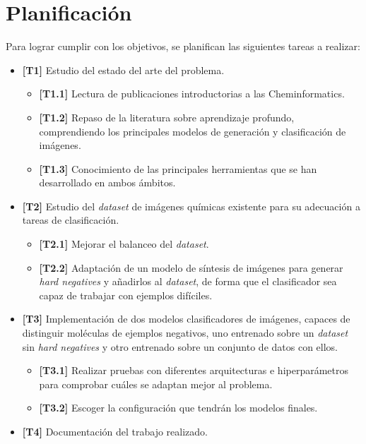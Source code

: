 \section{Planificación} \label{planificacion}
Para lograr cumplir con los objetivos, se planifican las siguientes tareas a realizar:
\begin{itemize}
    \item \textbf{[T1]} Estudio del estado del arte del problema.
    \begin{itemize}
        \item \textbf{[T1.1]} Lectura de publicaciones introductorias a las Cheminformatics.  
        \item \textbf{[T1.2]} Repaso de la literatura sobre aprendizaje profundo, comprendiendo los principales modelos de generación y clasificación de imágenes.
        \item \textbf{[T1.3]} Conocimiento de las principales herramientas que se han desarrollado en ambos ámbitos.
    \end{itemize}
    \item \textbf{[T2]} Estudio del \textit{dataset} de imágenes químicas existente para su adecuación a tareas de clasificación.
    \begin{itemize}
        \item \textbf{[T2.1]} Mejorar el balanceo del \textit{dataset}.
        \item \textbf{[T2.2]} Adaptación de un modelo de síntesis de imágenes para generar \textit{hard negatives} y añadirlos al \textit{dataset}, de forma que el clasificador sea capaz de trabajar con ejemplos difíciles.
    \end{itemize}
    \item \textbf{[T3]} Implementación de dos modelos clasificadores de imágenes, capaces de distinguir moléculas de ejemplos negativos, uno entrenado sobre un \textit{dataset} sin \textit{hard negatives} y otro entrenado sobre un conjunto de datos con ellos.
    \begin{itemize}
        \item \textbf{[T3.1]} Realizar pruebas con diferentes arquitecturas e hiperparámetros para comprobar cuáles se adaptan mejor al problema.
        \item \textbf{[T3.2]} Escoger la configuración que tendrán los modelos finales. 
    \end{itemize}
    \item \textbf{[T4]} Documentación del trabajo realizado.
\end{itemize}

